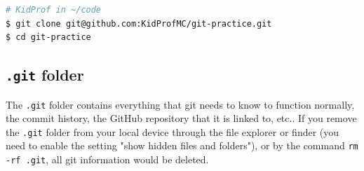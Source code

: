 \begin{lstlisting}[language=bash]
# KidProf in ~/code
$ git clone git@github.com:KidProfMC/git-practice.git
$ cd git-practice
\end{lstlisting}

\subsection{\texttt{.git} folder}

The \texttt{.git} folder contains everything that git needs to know to function normally, the commit history, the GitHub repository that it is linked to, etc.. If you remove the \texttt{.git} folder from your local device through the file explorer or finder (you need to enable the setting "show hidden files and folders"), or by the command \texttt{rm -rf .git}, all git information would be deleted.

